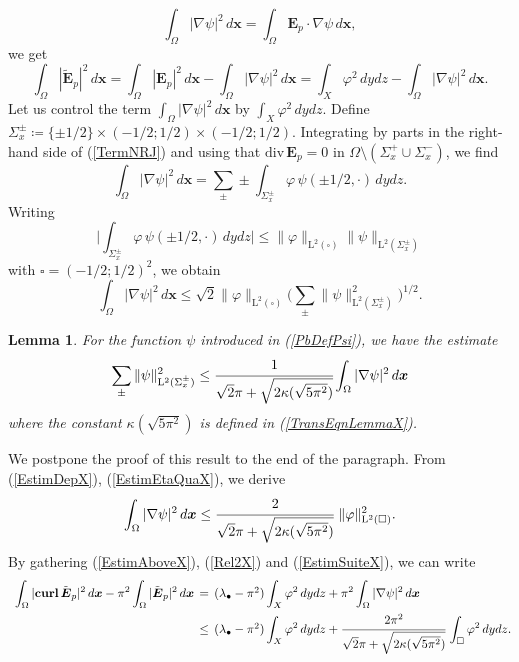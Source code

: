 \documentclass[11pt,a4paper]{article}
\newcommand{\dsp}{\displaystyle}
\newcommand{\Om}{\Omega}
\newcommand{\mrm}[1]{\mathrm{#1}}
\newcommand{\bfx}{\boldsymbol{x}}
\newcommand{\mL}{\mrm{L}}
\newcommand{\curlvec}{\boldsymbol{\mrm{curl}}\,}
\renewcommand{\div}{\mrm{div}}
\newcommand{\GX}{X}
\def\E{\boldsymbol{E}}
\newtheorem{lemma}[theorem]{Lemma}
\begin{document}
\begin{equation}\label{TermNRJ}
\int_{\Om}|\nabla\psi|^2\,d\bfx=\int_{\Om}\E_p\cdot\nabla\psi\,d\bfx,
\end{equation}
we get
\begin{equation}\label{Rel2X}
\int_{\Om} |\tilde{\E}_{p}|^2\,d\bfx=\int_{\Om} |\E_{p}|^2\,d\bfx-\int_{\Om} |\nabla\psi|^2\,d\bfx =\dsp\int_\GX\varphi^2\,dydz-\int_{\Om} |\nabla\psi|^2\,d\bfx.
\end{equation}
Let us control the term $\int_{\Om} |\nabla\psi|^2\,d\bfx$ by $\int_\GX\varphi^2\,dydz$. Define $\Sigma^\pm_x\coloneqq\{\pm1/2\}\times(-1/2;1/2)\times(-1/2;1/2)$. Integrating by parts in the right-hand side of (\ref{TermNRJ}) and using that $\div\,\E_p=0$ in $\Om\setminus(\Sigma^{+}_x\cup\Sigma^{-}_x)$, we find
\[
\dsp\int_\Om|\nabla\psi|^2\,d\bfx=\dsp\sum_\pm\pm\int_{\Sigma^\pm_x}\varphi\,\psi(\pm1/2,\cdot)\,dydz.
\]
Writing
\[
\bigg|\int_{\Sigma^\pm_x}\varphi\,\psi(\pm1/2,\cdot)\,dydz\bigg|\le \|\varphi\|_{\mL^2(\square)}\|\psi\|_{\mL^2(\Sigma^\pm_x)}
\]
with $\square=(-1/2;1/2)^2$, we obtain 
\begin{equation}\label{EstimDepX}
\int_\Om|\nabla\psi|^2\,d\bfx \le \sqrt{2}\|\varphi\|_{\mL^2(\square)}\big(\sum_\pm\|\psi\|^2_{\mL^2(\Sigma^\pm_x)}\big)^{1/2}.
\end{equation}
\begin{lemma}\label{LemmaProof6Legs1}
For the function $\psi$ introduced in (\ref{PbDefPsi}), we have the estimate
\begin{equation}\label{EstimEtaQuaX}
\sum_\pm\|\psi\|^2_{\mL^2(\Sigma^\pm_x)} \le \cfrac{1}{\sqrt{2}\pi+\sqrt{2\kappa(\sqrt{5\pi^2})}} \int_{\Om}|\nabla\psi|^2\,d\bfx
\end{equation}
where the constant $\kappa(\sqrt{5\pi^2})$ is defined in (\ref{TransEqnLemmaX}).
\end{lemma}
\noindent We postpone the proof of this result to the end of the paragraph. From (\ref{EstimDepX}), (\ref{EstimEtaQuaX}), we derive 
\begin{equation}\label{EstimSuiteX}
\int_\Om|\nabla\psi|^2\,d\bfx \le \cfrac{2}{\sqrt{2}\pi+\sqrt{2\kappa(\sqrt{5\pi^2})}}\ \|\varphi\|^2_{\mL^2(\square)}.
\end{equation}
By gathering (\ref{EstimAboveX}), (\ref{Rel2X}) and (\ref{EstimSuiteX}), we can write
\begin{equation}\label{EstimaInterX}
\begin{array}{rcl}
\dsp\int_{\Om} |\curlvec\tilde{\E}_{p}|^2\,d\bfx-\pi^2\int_{\Om} |\tilde{\E}_{p}|^2\,d\bfx &\hspace{-0.2cm}=&\hspace{-0.2cm}(\lambda_\bullet-\pi^2)\dsp\int_\GX\varphi^2\,dydz+\pi^2\int_{\Om} |\nabla\psi|^2\,d\bfx\\[10pt]
&\hspace{-0.2cm}\le&\hspace{-0.2cm}(\lambda_\bullet-\pi^2)\dsp\int_\GX\varphi^2\,dydz+\cfrac{2\pi^2}{\sqrt{2}\pi+\sqrt{2\kappa(\sqrt{5\pi^2})}}\,\dsp\int_{\square}\varphi^2\,dydz.
\end{array}\hspace{-0.2cm}
\end{equation}
\end{document}
